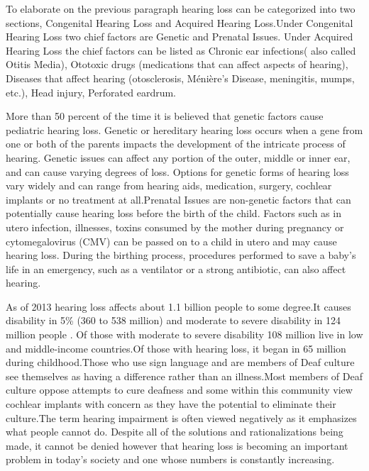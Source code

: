 \documentclass[sigconf]{acmart}
\begin{document}
To elaborate on the previous paragraph hearing loss can be categorized into two sections, Congenital Hearing Loss and Acquired Hearing Loss.Under Congenital Hearing Loss two chief factors are Genetic and Prenatal Issues. Under Acquired Hearing Loss the chief factors can be listed as Chronic ear infections( also called Otitis Media), Ototoxic drugs  (medications that can affect aspects of hearing), Diseases that affect hearing (otosclerosis, Ménière's Disease, meningitis, mumps, etc.), Head injury, Perforated eardrum\cite{Academy2017}.

More than 50 percent of the time it is believed that genetic factors cause pediatric hearing loss. Genetic or hereditary hearing loss occurs when a gene from one or both of the parents impacts the development of the intricate process of hearing. Genetic issues can affect any portion of the outer, middle or inner ear, and can cause varying degrees of loss. Options for genetic forms of hearing loss vary widely and can range from hearing aids, medication, surgery, cochlear implants or no treatment at all.Prenatal Issues are non-genetic factors that can potentially cause hearing loss before the birth of the child. Factors such as in utero infection, illnesses, toxins consumed by the mother during pregnancy or cytomegalovirus (CMV)  can be passed on to a child in utero and may cause hearing loss. During the birthing process, procedures performed to save a baby’s life in an emergency, such as a ventilator or a strong antibiotic, can also affect hearing\cite{Wikipedia2017}.

As of 2013 hearing loss affects about 1.1 billion people to some degree\cite{Wikipedia2017}.It causes disability in 5\% (360 to 538 million) and moderate to severe disability in 124 million people \cite{Wikipedia2017} . Of those with moderate to severe disability 108 million live in low and middle-income countries.Of those with hearing loss, it began in 65 million during childhood.Those who use sign language and are members of Deaf culture see themselves as having a difference rather than an illness.Most members of Deaf culture oppose attempts to cure deafness and some within this community view cochlear implants with concern as they have the potential to eliminate their culture.The term hearing impairment is often viewed negatively as it emphasizes what people cannot do. Despite all of the solutions and rationalizations being made, it cannot be denied however that hearing loss is becoming an important problem in today's society and one whose numbers is constantly increasing\cite{Wikipedia2017}.
\end{document}
